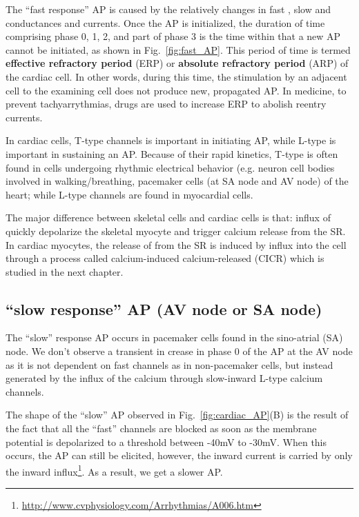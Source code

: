 The ``fast response'' AP is caused by the relatively changes in fast
, slow  and  conductances and currents. Once
the AP is initialized, the duration of time comprising phase 0, 1, 2,
and part of phase 3 is the time within that a new AP cannot be
initiated, as shown in Fig.~\ref{fig:fast_AP}. This period of time is
termed {\bf effective refractory period} (ERP) or
{\bf absolute refractory period} (ARP) of the cardiac cell. In other
words, during this time, the stimulation by an adjacent cell to the
examining cell does not produce new, propagated AP.  In medicine, to
prevent tachyarrythmias, drugs are used to increase ERP to abolish
reentry currents.

In cardiac cells, T-type  channels is important in
initiating AP, while L-type is important in sustaining an AP. Because
of their rapid kinetics, T-type is often found in cells undergoing
rhythmic electrical behavior (e.g. neuron cell bodies involved in
walking/breathing, pacemaker cells (at SA node and AV node) of the
heart; while L-type channels are found in myocardial cells.

The major difference between skeletal cells and cardiac cells is that:
influx of  quickly depolarize the skeletal myocyte and trigger
calcium release from the SR. In cardiac myocytes, the release of
 from the SR is induced by  influx into the cell
through a process called calcium-induced calcium-released (CICR) which
is studied in the next chapter.

\subsection{``slow response'' AP (AV node or SA node)}
\label{sec:slow-response-ap}

The ``slow'' response AP occurs in pacemaker cells found in the
sino-atrial (SA) node. We don't observe a transient in crease in phase
0 of the AP at the AV node as it is not dependent on fast 
channels as in non-pacemaker cells, but instead generated by the
influx of the calcium through slow-inward L-type calcium channels.


The shape of the ``slow'' AP observed in Fig.~\ref{fig:cardiac_AP}(B)
is the result of the fact that all the ``fast''  channels are
blocked as soon as the membrane potential is depolarized to
a threshold between -40mV to -30mV. When this occurs, the AP can still be
elicited, however, the inward current is carried by only the inward 
influx\footnote{\url{http://www.cvphysiology.com/Arrhythmias/A006.htm}}. As
a result, we get a slower AP.

